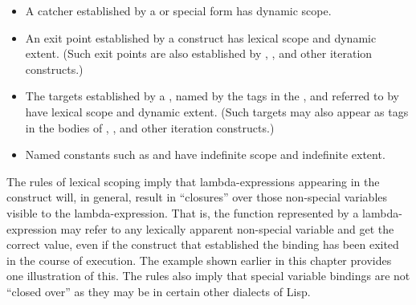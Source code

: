 \begin{itemize}
\item
A catcher established by a 
or  special form has dynamic
scope.

\item
An exit point established by a  construct has lexical
scope and dynamic extent.  (Such exit points are also established
by , , and other iteration constructs.)

\item
The  targets
established by a , named by the tags in the ,
and referred to by 
have lexical scope and dynamic extent.  (Such  targets
may also appear as tags in the bodies of
, , and other iteration constructs.)

\item
Named constants such as  and  have indefinite
scope and indefinite extent.
\end{itemize}

The rules of lexical scoping imply that lambda-expressions
appearing in the  construct will,
in general, result in ``closures''
over those non-special variables visible to the lambda-expression.
That is, the function represented by a lambda-expression
may refer to any lexically apparent non-special variable and get the
correct value, even if the construct that established the binding
has been exited in the course of execution.
The  example shown earlier in this chapter
provides one illustration of this.
The rules also imply that special variable bindings are not
``closed over'' as they may be in certain other dialects of Lisp.

